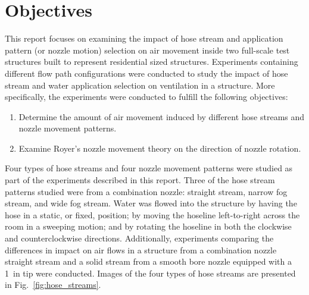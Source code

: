 \documentclass[12pt,oneside]{book}
\begin{document}
\section{Objectives}
\label{sec:objectives}
This report focuses on examining the impact of hose stream and application pattern (or nozzle motion) selection on air movement inside two full-scale test structures built to represent residential sized structures. Experiments containing different flow path configurations were conducted to study the impact of hose stream and water application selection on ventilation in a structure. More specifically, the experiments were conducted to fulfill the following objectives:

\begin{enumerate}
	\item Determine the amount of air movement induced by different hose streams and nozzle movement patterns.
	\item Examine Royer's nozzle movement theory on the direction of nozzle rotation.
\end{enumerate}

Four types of hose streams and four nozzle movement patterns were studied as part of the experiments described in this report. Three of the hose stream patterns studied were from a combination nozzle: straight stream, narrow fog stream, and wide fog stream. Water was flowed into the structure by having the hose in a static, or fixed, position; by moving the hoseline left-to-right across the room in a sweeping motion; and by rotating the hoseline in both the clockwise and counterclockwise directions. Additionally, experiments comparing the differences in impact on air flows in a structure from a combination nozzle straight stream and a solid stream from a smooth bore nozzle equipped with a 1~in tip were conducted. Images of the four types of hose streams are presented in Fig.~\ref{fig:hose_streams}.
\end{document}
